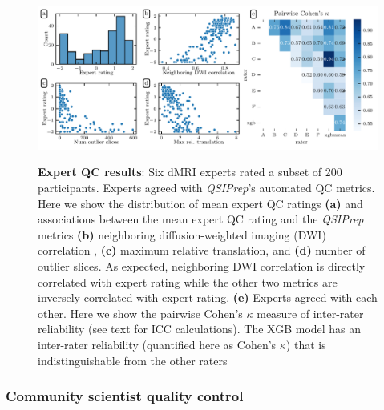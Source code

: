 \documentclass[fleqn,10pt,inline]{wlscirep}
\begin{document}
\begin{figure}[tbp]
    {\label{fig:expert-qc:scatter:hist}}
    {\label{fig:expert-qc:scatter:ndc}}
    {\label{fig:expert-qc:scatter:translation}}
    {\label{fig:expert-qc:scatter:outliers}}
    {\label{fig:expert-qc:irr}}
    \centering
    \includegraphics[width=\linewidth]{expert_qc.pdf}
    \caption{%
        {\bf Expert QC results}:
        Six dMRI experts rated a subset of \num{200} participants.  Experts agreed
        with \emph{QSIPrep}'s automated QC metrics.  Here we show the
        distribution of mean expert QC ratings \textbf{(a)} and associations
        between the mean expert QC rating and the \emph{QSIPrep} metrics
        \textbf{(b)} neighboring diffusion-weighted imaging (DWI) correlation 
        \cite{yeh2019-kb}, \textbf{(c)} maximum relative translation, and
        \textbf{(d)} number of outlier slices. As expected, neighboring DWI correlation is directly
        correlated with expert rating while the other two metrics are inversely
        correlated with expert rating.
        \textbf{(e)} Experts agreed with each other. Here we show the pairwise
        Cohen's $\kappa$ measure of inter-rater reliability (see text for ICC
        calculations). The XGB model has an inter-rater reliability (quantified
        here as Cohen's $\kappa$) that is indistinguishable from the other
        raters
    }
    \label{fig:expert-qc}
\end{figure}

\subsubsection*{Community scientist quality control}
\end{document}
